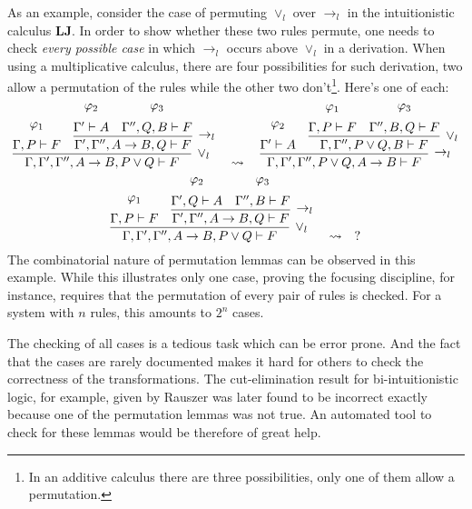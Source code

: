 \documentclass{llncs}
\begin{document}
As an example, consider the case of permuting $\vee_l$ over $\rightarrow_l$ in
the intuitionistic calculus \textbf{LJ}. In order to show whether these two
rules permute, one needs to check \emph{every possible case} in which
$\rightarrow_l$ occurs above $\vee_l$ in a derivation. When using a
multiplicative calculus, there are four possibilities for such derivation, two
allow a permutation of the rules while the other two don't\footnote{In an
additive calculus there are three possibilities, only one of them allow a
permutation.}. Here's one of each:
{\scriptsize
\[
\infer[\vee_l]{\Gamma, \Gamma', \Gamma'', A \rightarrow B , P \vee Q \vdash F}{
  \deduce{\Gamma, P \vdash F}{\varphi_1\vspace{0.2cm}}
  &
  \infer[\rightarrow_l]{\Gamma', \Gamma'', A \rightarrow B , Q \vdash F}{
    \deduce{\Gamma' \vdash A}{\varphi_2\vspace{0.2cm}}
    &
    \deduce{\Gamma'', Q, B \vdash F}{\varphi_3\vspace{0.2cm}}
  }
}
\quad\rightsquigarrow\quad
\infer[\rightarrow_l]{\Gamma, \Gamma', \Gamma'', P \vee Q, A \rightarrow B
\vdash F}{
  \deduce{\Gamma' \vdash A}{\varphi_2\vspace{0.2cm}}
  &
  \infer[\vee_l]{\Gamma, \Gamma'', P \vee Q, B \vdash F}{
    \deduce{\Gamma, P \vdash F}{\varphi_1\vspace{0.2cm}}
    &
    \deduce{\Gamma'', B, Q \vdash F}{\varphi_3\vspace{0.2cm}}
  }
}
\]
}
{\scriptsize
\[
\infer[\vee_l]{\Gamma, \Gamma', \Gamma'', A \rightarrow B , P \vee Q \vdash F}{
  \deduce{\Gamma, P \vdash F}{\varphi_1\vspace{0.2cm}}
  &
  \infer[\rightarrow_l]{\Gamma', \Gamma'', A \rightarrow B , Q \vdash F}{
    \deduce{\Gamma', Q \vdash A}{\varphi_2\vspace{0.2cm}}
    &
    \deduce{\Gamma'', B \vdash F}{\varphi_3\vspace{0.2cm}}
  }
}
\quad\rightsquigarrow\quad
?
\]
}
%
The combinatorial nature of permutation lemmas can be observed in this example.
While this illustrates only one case, proving the focusing discipline, for
instance, requires that the permutation of every pair of rules is checked. For a
system with $n$ rules, this amounts to $2^n$ cases.

The checking of all cases is a tedious task which can be error prone. And the
fact that the cases are rarely documented makes it hard for others to check the
correctness of the transformations. The cut-elimination result for
bi-intuitionistic logic, for example, given by Rauszer \cite{rauszer74studia}
was later found to be incorrect \cite{crolard01tcs} exactly because one of the
permutation lemmas was not true. An automated tool to check for these lemmas
would be therefore of great help.
\end{document}
